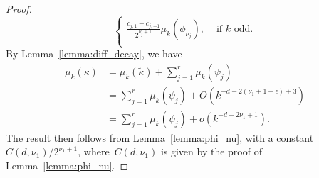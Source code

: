 \begin{proof}
\begin{equation}
\begin{cases}
	\frac{c_{j,1} - c_{j,-1}}{2^{\nu_j + 1}} \mu_k(\bar \phi_{\nu_j}), &\text{ if $k$ odd.}\\
\end{cases}
\end{equation}
By Lemma~\ref{lemma:diff_decay}, we have
\begin{align}
\mu_k(\kappa) &= \mu_k(\tilde \kappa) + \sum_{j=1}^r \mu_k(\psi_j) \\
	&= \sum_{j=1}^r \mu_k(\psi_j) + O(k^{-d - 2 (\nu_1 + 1 + \epsilon) + 3}) \\
	&= \sum_{j=1}^r \mu_k(\psi_j) + o(k^{-d - 2 \nu_{1} + 1}).
\end{align}
The result then follows from Lemma~\ref{lemma:phi_nu}, with a constant~$C(d, \nu_1) / 2^{\nu_1 + 1}$, where~$C(d, \nu_1)$ is given by the proof of Lemma~\ref{lemma:phi_nu}.
\end{proof}


